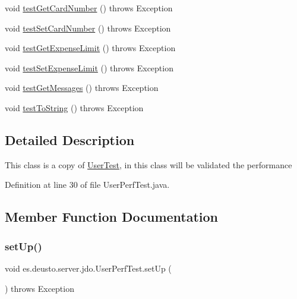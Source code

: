 \begin{DoxyCompactItemize}
\item 
void \hyperlink{classes_1_1deusto_1_1server_1_1jdo_1_1_user_perf_test_ad41dab134b1d2b5108d1be73aea650f1}{test\+Get\+Card\+Number} ()  throws Exception 
\item 
void \hyperlink{classes_1_1deusto_1_1server_1_1jdo_1_1_user_perf_test_a876ee3155a7522f155fd97e8850f1e85}{test\+Set\+Card\+Number} ()  throws Exception 
\item 
void \hyperlink{classes_1_1deusto_1_1server_1_1jdo_1_1_user_perf_test_a4b29567e33f758eb813deda8a28f79cf}{test\+Get\+Expense\+Limit} ()  throws Exception 
\item 
void \hyperlink{classes_1_1deusto_1_1server_1_1jdo_1_1_user_perf_test_a471f44e6ae8fe57f87d1cf8253037ccb}{test\+Set\+Expense\+Limit} ()  throws Exception 
\item 
void \hyperlink{classes_1_1deusto_1_1server_1_1jdo_1_1_user_perf_test_a422743db799f0da050647e2fe59574f7}{test\+Get\+Messages} ()  throws Exception 
\item 
void \hyperlink{classes_1_1deusto_1_1server_1_1jdo_1_1_user_perf_test_a6744a929575c948f3a725bc07ea17dd6}{test\+To\+String} ()  throws Exception 
\end{DoxyCompactItemize}


\subsection{Detailed Description}
This class is a copy of \hyperlink{classes_1_1deusto_1_1server_1_1jdo_1_1_user_test}{User\+Test}, in this class will be validated the performance 

Definition at line 30 of file User\+Perf\+Test.\+java.



\subsection{Member Function Documentation}
\mbox{\label{classes_1_1deusto_1_1server_1_1jdo_1_1_user_perf_test_a9f45a1081d058c5d1b0ca81d4cb42389}} 
\subsubsection{\texorpdfstring{set\+Up()}{setUp()}}
{\footnotesize\ttfamily void es.\+deusto.\+server.\+jdo.\+User\+Perf\+Test.\+set\+Up (\begin{DoxyParamCaption}{ }\end{DoxyParamCaption}) throws Exception}



